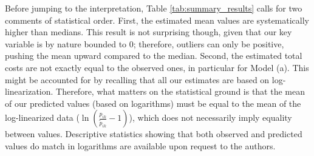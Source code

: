 \documentclass[a4paper,11pt]{article}
\begin{document}

Before jumping to the interpretation, Table \ref{tab:summary_results} calls for two comments of statistical order. First, the estimated mean values are systematically higher than medians. This result is not surprising though, given that our key variable is by nature bounded to 0; therefore, outliers can only be positive, pushing the mean upward compared to the median. Second, the estimated total costs are not exactly equal to the observed ones, in particular for Model (a). This might be accounted for by recalling that all our estimates are based on log-linearization. Therefore, what matters on the statistical ground is that the mean of our predicted values (based on logarithms) must be equal to the mean of the log-linearized data ($\ln\left(\frac{p_{ik}}{\widetilde{p}_{ik}}-1 \right)$), which does not necessarily imply equality between values.
Descriptive statistics showing that both observed and predicted values do match in logarithms are available upon request to the authors.
\end{document}
